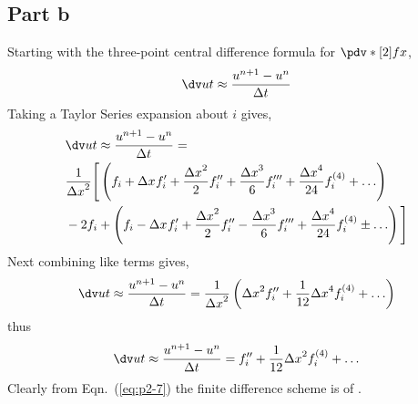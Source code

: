 \subsection{Part b}
Starting with the three-point central difference formula for $\pdv*[2]{f}{x}$,  
\begin{equation}
    \findif 
    \label{eq:p2-4}
\end{equation}
Taking a Taylor Series expansion about $i$ gives,
\begin{equation}
    \begin{split}
        &\findif =    \\
                    & \frac{1}{\Dx{2}}\Bigg[ \left( \fii + \Dx{} \fii^{\prime} + \frac{\Dx{2}}{2}\fii^{\prime \prime} + \frac{\Dx{3}}{6} \fii^{\prime \prime \prime} + \frac{\Dx{4} }{ 24 } \fii^{\left(4\right)} + \HOTs  \right)  \\
                    & -2\fii + \left( \fii - \Dx{} \fii^{\prime} + \frac{\Dx{2}}{2}\fii^{\prime \prime} - \frac{\Dx{3}}{6} \fii^{\prime \prime \prime} + \frac{\Dx{4} }{ 24 } \fii^{\left(4\right)} \pm \HOTs  \right) \Bigg]
    \end{split}
    \label{eq:p2-5}
\end{equation}
Next combining like terms gives,
\begin{equation}
    \findif = \frac{1}{\Dx{2}}\left(\Dx{2}\fii^{\prime \prime} + \frac{1}{12} \Dx{4} \fii^{\left( 4 \right)} + \HOTs \right)
    \label{eq:p2-6}
\end{equation}
thus
\begin{equation}
    \findif = \fii^{\prime \prime} + \frac{1}{12} \Dx{2} \fii^{\left(4\right)} + \HOTs
    \label{eq:p2-7}
\end{equation}
Clearly from Eqn.~(\ref{eq:p2-7}) the finite difference scheme is of .
\newcommand{\unone}{u^{n+1}}
\newcommand{\un}{u^{n}}
\renewcommand{\findif}{\dv{u}{t} \approx \frac{\unone - \un}{\Dt{}} }
\newcommand{\Dt}[1]{{\Delta t}^{#1}}
